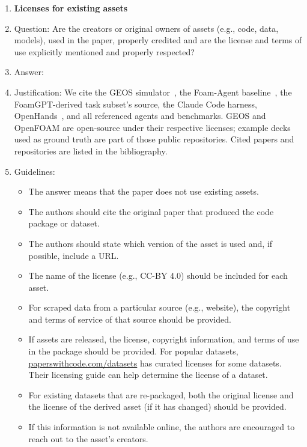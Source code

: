 \begin{enumerate}
\item {\bf Licenses for existing assets}
    \item[] Question: Are the creators or original owners of assets (e.g., code, data, models), used in the paper, properly credited and are the license and terms of use explicitly mentioned and properly respected?
    \item[] Answer: \answerYes{}
    \item[] Justification: We cite the GEOS simulator~\citep{geos2024}, the Foam-Agent baseline~\citep{foamagent2025}, the FoamGPT-derived task subset's source, the Claude Code harness, OpenHands~\citep{wang2024openhands}, and all referenced agents and benchmarks. GEOS and OpenFOAM are open-source under their respective licenses; example decks used as ground truth are part of those public repositories. Cited papers and repositories are listed in the bibliography.
    \item[] Guidelines:
    \begin{itemize}
        \item The answer \answerNA{} means that the paper does not use existing assets.
        \item The authors should cite the original paper that produced the code package or dataset.
        \item The authors should state which version of the asset is used and, if possible, include a URL.
        \item The name of the license (e.g., CC-BY 4.0) should be included for each asset.
        \item For scraped data from a particular source (e.g., website), the copyright and terms of service of that source should be provided.
        \item If assets are released, the license, copyright information, and terms of use in the package should be provided. For popular datasets, \url{paperswithcode.com/datasets} has curated licenses for some datasets. Their licensing guide can help determine the license of a dataset.
        \item For existing datasets that are re-packaged, both the original license and the license of the derived asset (if it has changed) should be provided.
        \item If this information is not available online, the authors are encouraged to reach out to the asset's creators.
    \end{itemize}


\end{enumerate}

